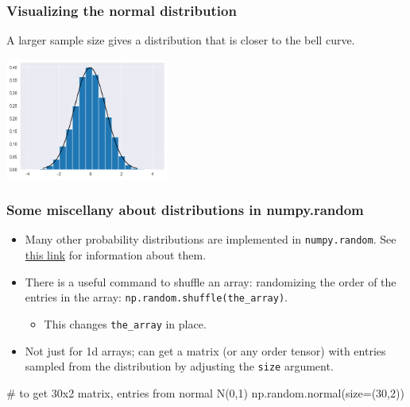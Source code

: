 \documentclass{beamer}
\newenvironment{codeblock}
    {\hfill\begin{beamerboxesrounded}[lower=codecol, width=0.8\textwidth]
    \medskip

    }
    { 
    \end{beamerboxesrounded}\hfill
    }
\theoremstyle{example}
\newcommand{\ct}[1]{\lstinline[language=Python]!#1!}
\newcommand{\ttt}[1]{{\small\texttt{#1}}}
\begin{document}

\begin{frame}[fragile]
\frametitle{Visualizing the normal distribution}
    
A larger sample size gives a distribution that is closer to the bell curve.
    
\centering
\includegraphics[width=0.4\textwidth]{histogram_of_sample4.png}
    
\end{frame}

\begin{frame}[fragile]
\frametitle{Some miscellany about distributions in {\ttm numpy.random}}
\begin{itemize}
    \item Many other probability distributions are implemented in \ttt{numpy.random}. See \href{https://numpy.org/doc/2.1/reference/random/legacy.html#distributions}{this link} for information about them.
    
    \pause
    \item There is a useful command to shuffle an array: randomizing the order of the entries in the array: \ttt{np.random.shuffle(the}\ct{_}\ttt{array)}.
    \begin{itemize}
        \item This changes \ttt{the}\ct{_}\ttt{array} in place.
    \end{itemize}

    \pause
    \item Not just for 1d arrays; can get a matrix (or any order tensor) with entries sampled from the distribution by adjusting the \ttt{size} argument.
\end{itemize}

\begin{codeblock}

\begin{python}
# to get 30x2 matrix, entries from normal N(0,1)
np.random.normal(size=(30,2))
\end{python}

\end{codeblock}

\end{frame}
\end{document}
